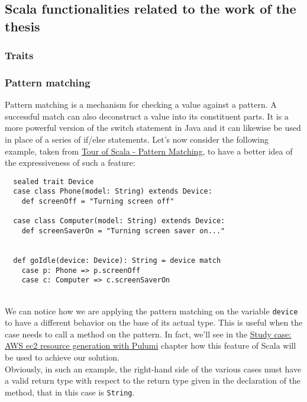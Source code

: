 \subsection{Scala functionalities related to the work of the thesis}

\subsubsection{Traits}

\subsubsection{Pattern matching}
Pattern matching is a mechanism for checking a value against a pattern.
A successful match can also deconstruct a value into its constituent parts.
It is a more powerful version of the switch statement in Java and it can likewise be used in place of a series of if/else statements.
Let's now consider the following example, taken from \href{https://docs.scala-lang.org/tour/pattern-matching.html#}{Tour of Scala - Pattern Matching}, to have a better idea of the expressiveness of such a feature:
\begin{verbatim}
  sealed trait Device
  case class Phone(model: String) extends Device:
    def screenOff = "Turning screen off"

  case class Computer(model: String) extends Device:
    def screenSaverOn = "Turning screen saver on..."


  def goIdle(device: Device): String = device match
    case p: Phone => p.screenOff
    case c: Computer => c.screenSaverOn
\end{verbatim}\mbox{}\\
We can notice how we are applying the pattern matching on the variable \texttt{device} to have a different behavior on the base of its actual type.
This is useful when the case needs to call a method on the pattern.
In fact, we'll see in the \hyperref[cap:study-case]{Study case: AWS ec2 resource generation with Pulumi} chapter how this feature of Scala will be used to achieve our solution.\\
Obviously, in such an example, the right-hand side of the various cases must have a valid return type with respect to the return type given in the declaration of the method, that in this case is \texttt{String}.

